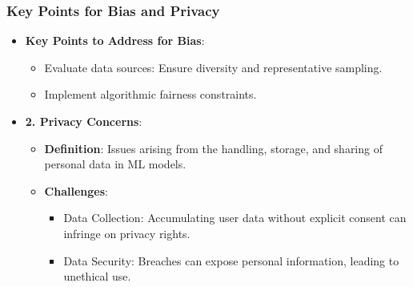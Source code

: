 \documentclass[aspectratio=169]{beamer}
\begin{document}
\begin{frame}[fragile]
    \frametitle{Key Points for Bias and Privacy}
    \begin{itemize}
        \item \textbf{Key Points to Address for Bias}:
        \begin{itemize}
            \item Evaluate data sources: Ensure diversity and representative sampling.
            \item Implement algorithmic fairness constraints.
        \end{itemize}
        \item \textbf{2. Privacy Concerns}:
        \begin{itemize}
            \item \textbf{Definition}: Issues arising from the handling, storage, and sharing of personal data in ML models.
            \item \textbf{Challenges}:
            \begin{itemize}
                \item Data Collection: Accumulating user data without explicit consent can infringe on privacy rights.
                \item Data Security: Breaches can expose personal information, leading to unethical use.
            \end{itemize}
        \end{itemize}
    \end{itemize}
\end{frame}
\end{document}
